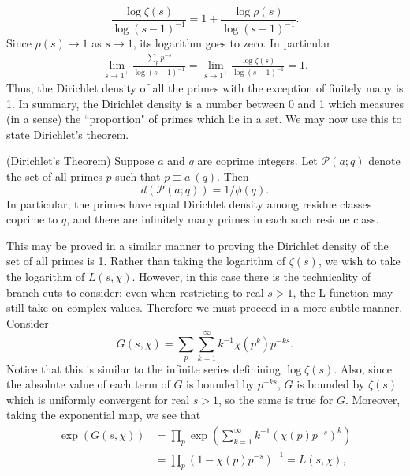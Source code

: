 \begin{equation}
    \frac{\log \zeta(s)}{\log(s - 1)^{-1}} = 1 + \frac{\log\rho(s)}{\log(s - 1)^{-1}}. \nonumber
\end{equation}
Since $\rho(s) \rightarrow 1$ as $s \rightarrow 1$, its logarithm goes to zero. In particular
\begin{align}
    \lim_{s \rightarrow 1^{+}}\frac{\sum_{p}p^{-s}}{\log(s - 1)^{-1}} = \lim_{s \rightarrow 1^{+}}\frac{\log\zeta(s)}{\log(s-1)^{-1}} = 1.
\end{align}
Thus, the Dirichlet density of all the primes with the exception of finitely many is 1. In summary, the Dirichlet density is a number between 0 and 1 which measures (in a sense) the ``proportion" of primes which lie in a set. We may now use this to state Dirichlet's theorem.
\begin{theorem}
(Dirichlet's Theorem) Suppose $a$ and $q$ are coprime integers. Let $\mathcal{P}(a; q)$ denote the set of all primes $p$ such that $p \equiv a \ (q)$. Then
\begin{equation}
    d\left(\mathcal{P}(a; q)\right) = 1/\phi(q). \nonumber
\end{equation}
In particular, the primes have equal Dirichlet density among residue classes coprime to $q$, and there are infinitely many primes in each such residue class.
\end{theorem}
This may be proved in a similar manner to proving the Dirichlet density of the set of all primes is 1. Rather than taking the logarithm of $\zeta(s)$, we wish to take the logarithm of $L(s, \chi)$. However, in this case there is the technicality of branch cuts to consider: even when restricting to real $s > 1$, the L-function may still take on complex values. Therefore we must proceed in a more subtle manner. Consider 
\begin{equation}
    G(s, \chi) = \sum_{p}\sum_{k=1}^{\infty} k^{-1}\chi(p^{k})p^{-ks}. \nonumber
\end{equation}
Notice that this is similar to the infinite series definining $\log\zeta(s)$. Also, since the absolute value of each term of $G$ is bounded by $p^{-ks}$, $G$ is bounded by $\zeta(s)$ which is uniformly convergent for real $s > 1$, so the same is true for $G$. Moreover, taking the exponential map, we see that
\begin{align}
    \exp(G(s, \chi)) &= \prod_{p} \exp\left(\sum_{k=1}^{\infty}k^{-1}(\chi(p)p^{-s})^{k}\right) \nonumber \\
    &= \prod_{p} (1 - \chi(p)p^{-s})^{-1} = L(s, \chi), \nonumber
\end{align}
